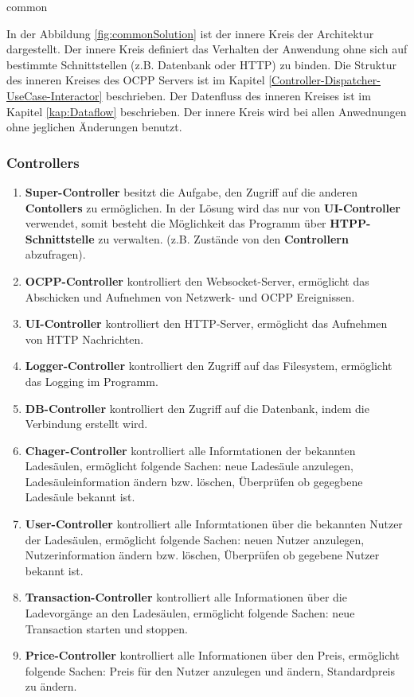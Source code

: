 {common}

In der Abbildung \ref{fig:commonSolution} ist der innere Kreis der Architektur dargestellt. Der innere Kreis definiert das Verhalten der Anwendung 
ohne sich auf bestimmte Schnittstellen (z.B. Datenbank oder HTTP) zu binden. 
Die Struktur des inneren Kreises des OCPP Servers ist im Kapitel \ref{Controller-Dispatcher-UseCase-Interactor} beschrieben. 
Der Datenfluss des inneren Kreises ist im Kapitel \ref{kap:Dataflow} beschrieben.
Der innere Kreis wird bei allen Anwednungen ohne jeglichen Änderungen benutzt.

\subsubsection{Controllers}

\begin{enumerate}
    \item \textbf{Super-Controller} besitzt die Aufgabe, den Zugriff auf die anderen \textbf{Contollers} zu ermöglichen. 
    In der Lösung wird das nur von \textbf{UI-Controller} verwendet, somit besteht die Möglichkeit das Programm über \textbf{HTPP-Schnittstelle} zu verwalten. 
    (z.B. Zustände von den \textbf{Controllern} abzufragen).
    \item \textbf{OCPP-Controller} kontrolliert den Websocket-Server, ermöglicht das Abschicken und Aufnehmen von Netzwerk- und OCPP Ereignissen.
    \item \textbf{UI-Controller} kontrolliert den HTTP-Server, ermöglicht das Aufnehmen von HTTP Nachrichten.
    \item \textbf{Logger-Controller} kontrolliert den Zugriff auf das Filesystem, ermöglicht das Logging im Programm.
    \item \textbf{DB-Controller} kontrolliert den Zugriff auf die Datenbank, indem die Verbindung erstellt wird.
    \item \textbf{Chager-Controller} kontrolliert alle Informtationen der bekannten Ladesäulen, 
    ermöglicht folgende Sachen: neue Ladesäule anzulegen, Ladesäuleinformation ändern bzw. löschen, Überprüfen ob gegegbene Ladesäule bekannt ist.
    \item \textbf{User-Controller} kontrolliert alle Informtationen über die bekannten Nutzer der Ladesäulen, ermöglicht folgende Sachen:
    neuen Nutzer anzulegen, Nutzerinformation ändern bzw. löschen, Überprüfen ob gegebene Nutzer bekannt ist.
    \item \textbf{Transaction-Controller} kontrolliert alle Informationen über die Ladevorgänge an den Ladesäulen, 
    ermöglicht folgende Sachen: neue Transaction starten und stoppen.
    \item \textbf{Price-Controller} kontrolliert alle Informationen über den Preis, ermöglicht folgende Sachen:
    Preis für den Nutzer anzulegen und ändern, Standardpreis zu ändern.
\end{enumerate}

